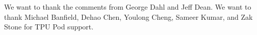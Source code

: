 We want to thank the comments from George Dahl and Jeff Dean.
We want to thank Michael Banfield, Dehao Chen, Youlong Cheng, Sameer Kumar, and Zak Stone for TPU Pod support.
